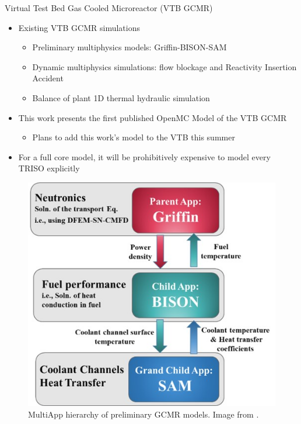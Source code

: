 \documentclass[9pt,t,aspectratio=169]{beamer}
\begin{document}
\begin{frame}{Virtual Test Bed Gas Cooled Microreactor (VTB GCMR)}
    \begin{minipage}[t]{0.525\linewidth}
        \begin{itemize}
            \item Existing VTB GCMR simulations
            \begin{itemize}
                \item Preliminary multiphysics models: Griffin-BISON-SAM \cite{Stauff-preliminary-applications-2021,Stauff-applications-2022,Abdelhameed-ANS-2022}
                \item Dynamic multiphysics simulations: flow blockage and Reactivity Insertion Accident \cite{HF_MRs_ANL}
                \item Balance of plant 1D thermal hydraulic simulation \cite{Duchnowski_plant_balance_2022}
            \end{itemize}
            \item This work presents the first published OpenMC Model of the VTB GCMR
            \begin{itemize}
                \item Plans to add this work's model to the VTB this summer
            \end{itemize}
            \item For a full core model, it will be prohibitively expensive to model every TRISO explicitly
        \end{itemize}
    \end{minipage}
    \hfill%
    \begin{minipage}[t]{0.425\linewidth}
        \begin{figure}
            \centering
            \includegraphics[width=0.875\linewidth]{figures/gcmr_preliminary_mutliapps.png}
            \caption{MultiApp hierarchy of preliminary GCMR models. Image from \cite{Abdelhameed-ANS-2022}.}
        \end{figure}
    \end{minipage}

\end{frame}
\end{document}
